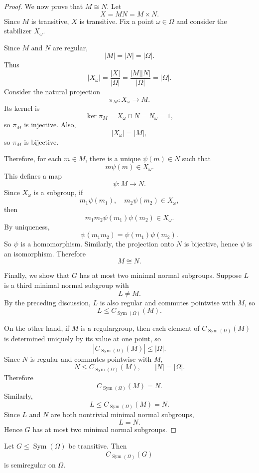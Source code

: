 \begin{proof}
We now prove that \(M\cong N\). Let
\[
X=MN=M\times N.
\]
Since \(M\) is transitive, \(X\) is transitive. Fix a point \(\omega\in\Omega\) and consider the stabilizer \(X_\omega\).

Since \(M\) and \(N\) are regular,
\[
|M|=|N|=|\Omega|.
\]
Thus
\[
|X_\omega|
=
\frac{|X|}{|\Omega|}
=
\frac{|M||N|}{|\Omega|}
=
|\Omega|.
\]
Consider the natural projection
\[
\pi_M\colon X_\omega\longrightarrow M.
\]
Its kernel is
\[
\ker\pi_M=X_\omega\cap N=N_\omega=1,
\]
so \(\pi_M\) is injective. Also,
\[
|X_\omega|=|M|,
\]
so \(\pi_M\) is bijective.

Therefore, for each \(m\in M\), there is a unique \(\psi(m)\in N\) such that
\[
m\psi(m)\in X_\omega.
\]
This defines a map
\[
\psi\colon M\longrightarrow N.
\]
Since \(X_\omega\) is a subgroup, if
\[
m_1\psi(m_1),\quad m_2\psi(m_2)\in X_\omega,
\]
then
\[
m_1m_2\psi(m_1)\psi(m_2)\in X_\omega.
\]
By uniqueness,
\[
\psi(m_1m_2)=\psi(m_1)\psi(m_2).
\]
So \(\psi\) is a homomorphism. Similarly, the projection onto \(N\) is bijective, hence \(\psi\) is an isomorphism. Therefore
\[
M\cong N.
\]

Finally, we show that \(G\) has at most two minimal normal subgroups. Suppose \(L\) is a third minimal normal subgroup with
\[
L\neq M.
\]
By the preceding discussion, \(L\) is also regular and commutes pointwise with \(M\), so
\[
L\leq C_{\operatorname{Sym}(\Omega)}(M).
\]

On the other hand, if \(M\) is a regulargroup, then each element of \(C_{\operatorname{Sym}(\Omega)}(M)\) is determined uniquely by its value at one point, so
\[
|C_{\operatorname{Sym}(\Omega)}(M)|\leq |\Omega|.
\]
Since \(N\) is regular and commutes pointwise with \(M\),
\[
N\leq C_{\operatorname{Sym}(\Omega)}(M),
\qquad
|N|=|\Omega|.
\]
Therefore
\[
C_{\operatorname{Sym}(\Omega)}(M)=N.
\]
Similarly,
\[
L\leq C_{\operatorname{Sym}(\Omega)}(M)=N.
\]
Since \(L\) and \(N\) are both nontrivial minimal normal subgroups,
\[
L=N.
\]
Hence \(G\) has at most two minimal normal subgroups.
\end{proof}

\begin{corollary}
    Let \(G\leq \operatorname{Sym}(\Omega)\) be transitive. Then
    \[
        C_{\operatorname{Sym}(\Omega)}(G)
    \]
    is semiregular on \(\Omega\).
    \end{corollary}
    
